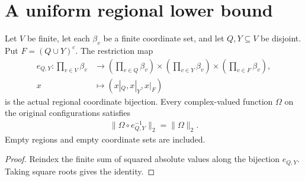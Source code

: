\section{A uniform regional lower bound}

\begin{theorem}
  \label{thm:regional_physical_vector_norm}
  \leanok
  Let $V$ be finite, let each $\beta_v$ be a finite coordinate set,
  and let $Q,Y\subseteq V$ be disjoint. Put $F=(Q\cup Y)^c$.
  The restriction map
  \begin{align*}
    e_{Q,Y}:\prod_{v\in V}\beta_v
      &\longrightarrow
        \left(\prod_{v\in Q}\beta_v\right)\times
        \left(\prod_{v\in Y}\beta_v\right)\times
        \left(\prod_{v\in F}\beta_v\right),\\
    x&\longmapsto(x|_Q,x|_Y,x|_F)
  \end{align*}
  is the actual regional coordinate bijection. Every complex-valued
  function $\Omega$ on the original configurations satisfies
  \begin{align*}
    \|\Omega\circ e_{Q,Y}^{-1}\|_2=\|\Omega\|_2.
  \end{align*}
  Empty regions and empty coordinate sets are included.
\end{theorem}
\begin{proof}\leanok
  Reindex the finite sum of squared absolute values along the bijection
  $e_{Q,Y}$. Taking square roots gives the identity.
\end{proof}

